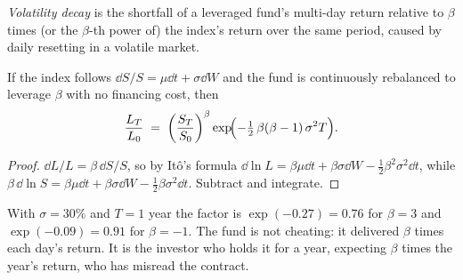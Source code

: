 \begin{omfigure}

\label{fig:m1:exchange-traded-funds:rebalance}
\end{omfigure}

\begin{definition}\label{def:m1:exchange-traded-funds:decay}
\emph{Volatility decay} is the shortfall of a
leveraged fund's multi-day return relative to $\beta$ times (or the $\beta$-th
power of) the index's return over the same period, caused by daily
resetting in a volatile market.
\end{definition}

\begin{proposition}\label{prop:m1:exchange-traded-funds:decay}
If the index follows $\dd S/S = \mu\dd t + \sigma\dd W$ and the fund is
continuously rebalanced to leverage $\beta$ with no financing cost, then
\[
\frac{L_T}{L_0} \;=\; \left(\frac{S_T}{S_0}\right)^{\beta}
\exp\!\Bigl(-\tfrac12\,\beta(\beta-1)\,\sigma^2 T\Bigr).
\]
\end{proposition}
\begin{proof}
$\dd L/L = \beta\,\dd S/S$, so by It\^o's formula $\dd\ln L = \beta\mu\dd t +
\beta\sigma\dd W - \tfrac12\beta^2\sigma^2\dd t$, while $\beta\,\dd\ln S =
\beta\mu\dd t + \beta\sigma\dd W - \tfrac12\beta\sigma^2\dd t$. Subtract and
integrate.
\end{proof}

With $\sigma = 30\%$ and $T = 1$ year the factor is $\exp(-0.27) = 0.76$ for
$\beta = 3$ and $\exp(-0.09) = 0.91$ for $\beta = -1$. The fund is not
cheating: it delivered $\beta$ times each day's return. It is the investor
who holds it for a year, expecting $\beta$ times the year's return, who has
misread the contract.

